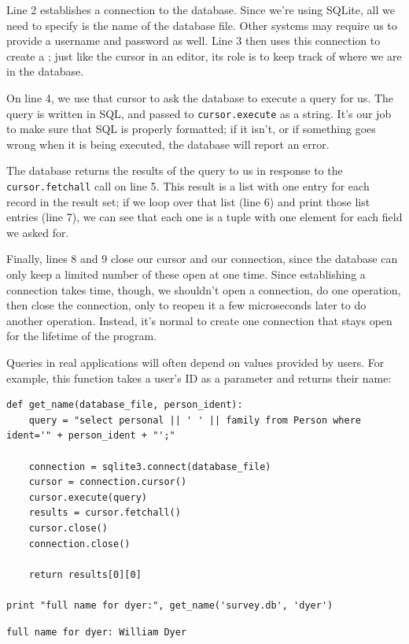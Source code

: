 \documentclass{book}
\begin{document}
Line 2 establishes a connection to the database. Since we're using
SQLite, all we need to specify is the name of the database file. Other
systems may require us to provide a username and password as well. Line
3 then uses this connection to create a ;
just like the cursor in an editor, its role is to keep track of where we
are in the database.

On line 4, we use that cursor to ask the database to execute a query for
us. The query is written in SQL, and passed to \texttt{cursor.execute}
as a string. It's our job to make sure that SQL is properly formatted;
if it isn't, or if something goes wrong when it is being executed, the
database will report an error.

The database returns the results of the query to us in response to the
\texttt{cursor.fetchall} call on line 5. This result is a list with one
entry for each record in the result set; if we loop over that list (line
6) and print those list entries (line 7), we can see that each one is a
tuple with one element for each field we asked for.

Finally, lines 8 and 9 close our cursor and our connection, since the
database can only keep a limited number of these open at one time. Since
establishing a connection takes time, though, we shouldn't open a
connection, do one operation, then close the connection, only to reopen
it a few microseconds later to do another operation. Instead, it's
normal to create one connection that stays open for the lifetime of the
program.

Queries in real applications will often depend on values provided by
users. For example, this function takes a user's ID as a parameter and
returns their name:

\begin{verbatim}
def get_name(database_file, person_ident):
    query = "select personal || ' ' || family from Person where ident='" + person_ident + "';"

    connection = sqlite3.connect(database_file)
    cursor = connection.cursor()
    cursor.execute(query)
    results = cursor.fetchall()
    cursor.close()
    connection.close()

    return results[0][0]

print "full name for dyer:", get_name('survey.db', 'dyer')
\end{verbatim}

\begin{verbatim}
full name for dyer: William Dyer
\end{verbatim}
\end{document}
